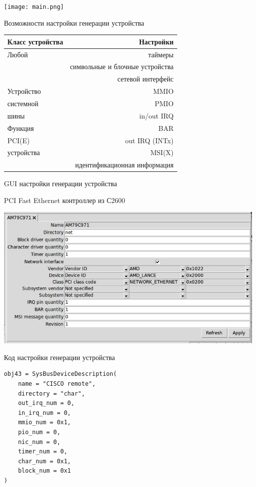 \documentclass[unicode,hyperref={unicode=true}]{beamer}
\theoremstyle{definition}
\theoremstyle{plain}
\begin{document}
\begin{frame}{}
\texttt{[image: main.png]}
\end{frame}



\begin{frame}{Возможности настройки генерации устройства}
\begin{center}
\begin{tabular}{l|r}
Класс устройства & Настройки \\
\hline
Любой            & таймеры \\
                 & символьные и блочные устройства \\
                 & сетевой интерфейс \\
\hline
Устройство       & MMIO \\
системной        & PMIO \\
шины             & in/out IRQ \\
\hline
Функция          & BAR \\
PCI(E)           & out IRQ (INTx) \\
устройства       & MSI(X) \\
                 & идентификационная информация
\end{tabular}
\end{center}
\end{frame}



\begin{frame}{GUI настройки генерации устройства}
\begin{center}
PCI Fast Ethernet контроллер из С2600
\end{center}
\includegraphics[width=\linewidth]{AM79C971.jpg}
\end{frame}



\begin{frame}[fragile]{Код настройки генерации устройства}

\lstset{language=Python}
\begin{lstlisting}
obj43 = SysBusDeviceDescription(
    name = "CISCO remote",
    directory = "char",
    out_irq_num = 0,
    in_irq_num = 0,
    mmio_num = 0x1,
    pio_num = 0,
    nic_num = 0,
    timer_num = 0,
    char_num = 0x1,
    block_num = 0x1
)
\end{lstlisting}

\end{frame}
\end{document}
